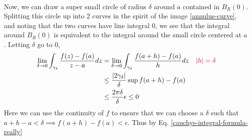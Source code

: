 \documentclass{homework}
\begin{document}
\begin{solution}
\begin{align}
                                                                                                                                                                                                                       \end{align}
                                                                                                                                                                                                                       Now, we can draw a super small circle of radius $\delta$ around $a$ contained in $B_R(0)$. Splitting this circle up into 2 curves in the spirit of the image \ref{annulus-curve}, and noting that the two curves have line integral 0, we see that the integral around $B_R(0)$ is equivalent to the integral around the small circle centered at $a$. Letting $\delta$ go to 0, 
                                                                                                                                                                                                                       \begin{align*}
                                                                                                                                                                                                                       \lim_{\delta\to 0} \int_{\gamma_{\delta}} \frac{f(z)-f(a)}{z-a} dz &= \lim_{\delta\to 0} \int_{\gamma_{\delta}} \frac{f(a+h)-f(a)}{h} dz \color{purple}\quad |h| = \delta\\
                                                                                                                                                                                                                       &\leq \frac{|2\gamma_{\delta}|}{\delta}\sup{f(a+h) - f(a)}\\
                                                                                                                                                                                                                       &\leq \frac{2\pi\delta}{\delta}\epsilon \leq 0 
                                                                                                                                                                                                                       \end{align*}
                                                                                                                                                                                                                       Here we can use the continuity of $f$ to ensure that we can choose a $\delta$ such that $a+h - a<\delta \implies f(a+h) - f(a) < \epsilon$. Thus by Eq. \ref{cauchys-integral-formula-really}

\end{solution}
\end{document}
